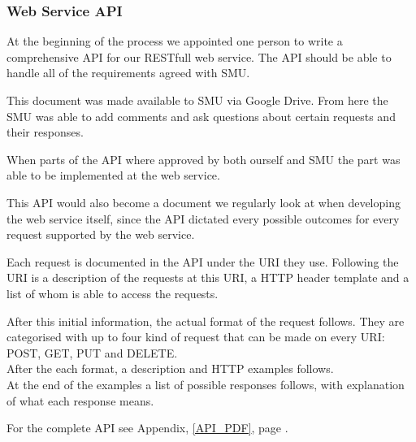 \subsubsection{Web Service API}
At the beginning of the process we appointed one person to write a comprehensive API for our RESTfull web service.
The API should be able to handle all of the requirements agreed with SMU.

This document was made available to SMU via Google Drive. From here the SMU was able to add comments and ask questions about certain requests and their responses.

When parts of the API where approved by both ourself and SMU the part was able to be implemented at the web service.

This API would also become a document we regularly look at when developing the web service itself, since the API dictated every possible outcomes for every request supported by the web service.

Each request is documented in the API under the URI they use. Following the URI is a description of the requests at this URI, a HTTP header template and a list of whom is able to access the requests.

After this initial information, the actual format of the request follows. They are categorised with up to four kind of request that can be made on every URI: POST, GET, PUT and DELETE. \\
After the each format, a description and HTTP examples follows. \\
At the end of the examples a list of possible responses follows, with explanation of what each response means.

For the complete API see Appendix, \ref{API_PDF}, page \pageref{API_PDF}.